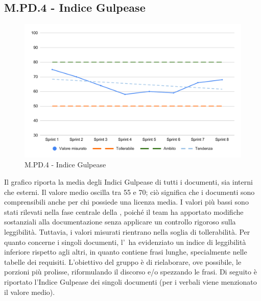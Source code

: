 \subsection{M.PD.4 - Indice Gulpease}
\begin{figure}[H]
    \centering
    \includegraphics[width=\textwidth]{assets/indice_gulpease.pdf}
    \caption{M.PD.4 - Indice Gulpease}
\end{figure}

\par Il grafico riporta la media degli Indici Gulpease di tutti i documenti, sia interni che esterni. Il valore medio oscilla tra 55 e 70; ciò significa che i documenti sono comprensibili anche per chi possiede una licenza media. I valori più bassi sono stati rilevati nella fase centrale della , poiché il team ha apportato modifiche sostanziali alla documentazione senza applicare un controllo rigoroso sulla leggibilità. Tuttavia, i valori misurati rientrano nella soglia di tollerabilità. Per quanto concerne i singoli documenti, l’\AdR\ ha evidenziato un indice di leggibilità inferiore rispetto agli altri, in quanto contiene frasi lunghe, specialmente nelle tabelle dei requisiti. L’obiettivo del gruppo è di rielaborare, ove possibile, le porzioni più prolisse, riformulando il discorso e/o spezzando le frasi. Di seguito è riportato l’Indice Gulpease dei singoli documenti (per i verbali viene menzionato il valore medio).